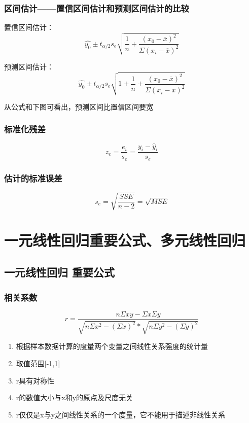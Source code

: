 \documentclass[UTF8,10pt]{book}
\begin{document}
\subsection{区间估计——置信区间估计和预测区间估计的比较}	

置信区间估计： 
$$ \hat{y_0} \pm t_{\alpha / 2} s_e \sqrt{ \frac{1}{n} + \frac{(x_0 - \overline{x})^2}{\Sigma (x_i - \overline{x})^2}} $$ 

预测区间估计： 
$$ \hat{y_0} \pm t_{\alpha / 2} s_e \sqrt{1+ \frac{1}{n} + \frac{(x_0 - \overline{x})^2}{\Sigma (x_i - \overline{x})^2}} $$ 

从公式和下图可看出，预测区间比置信区间要宽

\subsection{标准化残差}	
$$ z_e = \frac{e_i}{s_e}= \frac{y_i - \hat{y}_i}{s_e} $$

\subsection{估计的标准误差}	

$$ s_e = \sqrt{ \frac{SSE}{n-2} } = \sqrt{MSE} $$

\clearpage

\chapter{一元线性回归重要公式、多元线性回归}



\section{一元线性回归 重要公式}\label{header-n55}

\subsection{相关系数}\label{header-n56}

\[r = \frac{n \Sigma xy -\Sigma x \Sigma y }{\sqrt{n \Sigma x^2 - \left( \Sigma x \right)^2}  * \sqrt{n \Sigma y^2 - \left( \Sigma y \right)^2}  }\]

\begin{enumerate}
	\def\labelenumi{\arabic{enumi}.}
	\item
	根据样本数据计算的度量两个变量之间线性关系强度的统计量
	\item
	取值范围{[}-1,1{]}
	\item
	r具有对称性
	\item
	r的数值大小与x和y的原点及尺度无关
	\item
	r仅仅是x与y之间线性关系的一个度量，它不能用于描述非线性关系
\end{enumerate}
\end{document}
